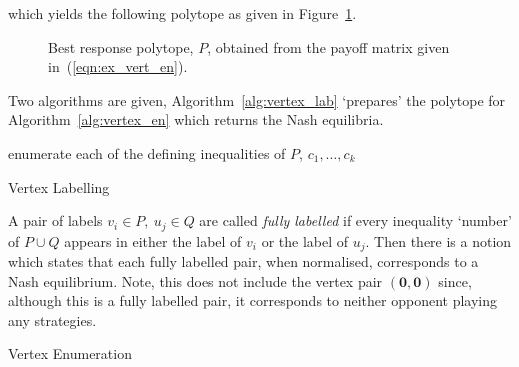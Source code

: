 which yields the following polytope as given in Figure~\ref{fig:best_resp_polytope}.

\begin{figure}
    \centering
    
    \caption{Best response polytope, \(P\), obtained from the payoff matrix given in~(\ref{eqn:ex_vert_en}).}\label{fig:best_resp_polytope}
\end{figure}

Two algorithms are given, Algorithm~\ref{alg:vertex_lab} `prepares' the polytope
for Algorithm~\ref{alg:vertex_en} which returns the Nash equilibria.

\IncMargin{2em}
\begin{algorithm}
    \footnotesize
    \DontPrintSemicolon

    enumerate each of the defining inequalities of \(P\), \(c_{1}, \ldots,
    c_{k}\) \\
    \caption{Vertex Labelling}\label{alg:vertex_lab}
\end{algorithm}
\DecMargin{2em}

A pair of labels \(v_{i} \in P, ~ u_{j} \in Q\) are called \emph{fully labelled}
if every inequality `number' of \(P \cup Q\) appears in either the label of
\(v_{i}\) or the label of \(u_{j}\). Then there is a notion which states that
each fully labelled pair, when normalised, corresponds to a Nash equilibrium.
Note, this does not include the vertex pair \((\textbf{0}, \textbf{0})\) since,
although this is a fully labelled pair, it corresponds to neither opponent playing any strategies. 

\IncMargin{2em}
\begin{algorithm}
    \footnotesize
    \DontPrintSemicolon

    \caption{Vertex Enumeration}\label{alg:vertex_en}
\end{algorithm}
\DecMargin{2em}

